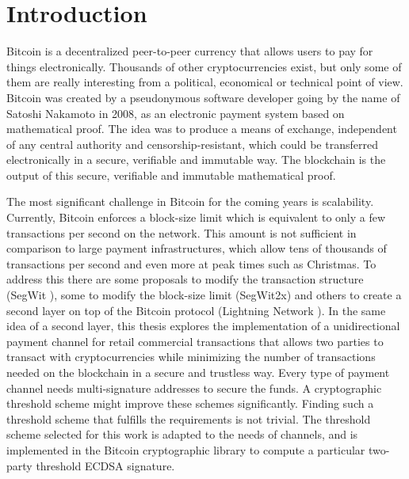 \chapter{Introduction}
\label{chap:introduction}

Bitcoin is a decentralized peer-to-peer currency that allows users to pay for
things electronically. Thousands of other cryptocurrencies exist, but only some
of them are really interesting from a political, economical or technical point
of view. Bitcoin was created by a pseudonymous software developer going by the
name of Satoshi Nakamoto in 2008, as an electronic payment system based on
mathematical proof. The idea was to produce a means of exchange, independent of
any central authority and censorship-resistant, which could be transferred
electronically in a secure, verifiable and immutable way. The blockchain is the
output of this secure, verifiable and immutable mathematical proof.

The most significant challenge in Bitcoin for the coming years is scalability.
Currently, Bitcoin enforces a block-size limit which is equivalent to only a few
transactions per second on the network. This amount is not sufficient in
comparison to large payment infrastructures, which allow tens of thousands of
transactions per second and even more at peak times such as Christmas.  To
address this there are some proposals to modify the transaction structure (SegWit \cite{SegWitBIP}),
some to modify the block-size limit (SegWit2x) and others to
create a second layer on top of the Bitcoin protocol (Lightning Network \cite{poon2016bitcoin}).
In the same idea of a second layer, this thesis explores the
implementation of a unidirectional payment channel for retail commercial
transactions that allows two parties to
transact with cryptocurrencies while minimizing the number of transactions needed
on the blockchain in a secure and trustless way. Every type of payment channel needs
multi-signature addresses to secure the funds. A cryptographic threshold scheme
might improve these schemes significantly. Finding such a threshold scheme that
fulfills the requirements is not trivial. The threshold scheme selected for this work is
adapted to the needs of channels, and is implemented in the Bitcoin cryptographic
library to compute a particular two-party threshold ECDSA signature.
